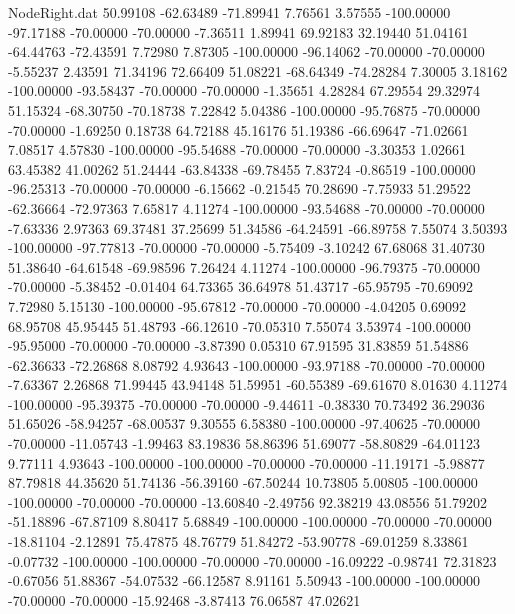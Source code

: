 \begin{filecontents}{NodeRight.dat}
  50.99108  -62.63489  -71.89941     7.76561    3.57555 -100.00000  -97.17188  -70.00000  -70.00000   -7.36511    1.89941   69.92183   32.19440
  51.04161  -64.44763  -72.43591     7.72980    7.87305 -100.00000  -96.14062  -70.00000  -70.00000   -5.55237    2.43591   71.34196   72.66409
  51.08221  -68.64349  -74.28284     7.30005    3.18162 -100.00000  -93.58437  -70.00000  -70.00000   -1.35651    4.28284   67.29554   29.32974
  51.15324  -68.30750  -70.18738     7.22842    5.04386 -100.00000  -95.76875  -70.00000  -70.00000   -1.69250    0.18738   64.72188   45.16176
  51.19386  -66.69647  -71.02661     7.08517    4.57830 -100.00000  -95.54688  -70.00000  -70.00000   -3.30353    1.02661   63.45382   41.00262
  51.24444  -63.84338  -69.78455     7.83724   -0.86519 -100.00000  -96.25313  -70.00000  -70.00000   -6.15662   -0.21545   70.28690   -7.75933
  51.29522  -62.36664  -72.97363     7.65817    4.11274 -100.00000  -93.54688  -70.00000  -70.00000   -7.63336    2.97363   69.37481   37.25699
  51.34586  -64.24591  -66.89758     7.55074    3.50393 -100.00000  -97.77813  -70.00000  -70.00000   -5.75409   -3.10242   67.68068   31.40730
  51.38640  -64.61548  -69.98596     7.26424    4.11274 -100.00000  -96.79375  -70.00000  -70.00000   -5.38452   -0.01404   64.73365   36.64978
  51.43717  -65.95795  -70.69092     7.72980    5.15130 -100.00000  -95.67812  -70.00000  -70.00000   -4.04205    0.69092   68.95708   45.95445
  51.48793  -66.12610  -70.05310     7.55074    3.53974 -100.00000  -95.95000  -70.00000  -70.00000   -3.87390    0.05310   67.91595   31.83859
  51.54886  -62.36633  -72.26868     8.08792    4.93643 -100.00000  -93.97188  -70.00000  -70.00000   -7.63367    2.26868   71.99445   43.94148
  51.59951  -60.55389  -69.61670     8.01630    4.11274 -100.00000  -95.39375  -70.00000  -70.00000   -9.44611   -0.38330   70.73492   36.29036
  51.65026  -58.94257  -68.00537     9.30555    6.58380 -100.00000  -97.40625  -70.00000  -70.00000  -11.05743   -1.99463   83.19836   58.86396
  51.69077  -58.80829  -64.01123     9.77111    4.93643 -100.00000 -100.00000  -70.00000  -70.00000  -11.19171   -5.98877   87.79818   44.35620
  51.74136  -56.39160  -67.50244    10.73805    5.00805 -100.00000 -100.00000  -70.00000  -70.00000  -13.60840   -2.49756   92.38219   43.08556
  51.79202  -51.18896  -67.87109     8.80417    5.68849 -100.00000 -100.00000  -70.00000  -70.00000  -18.81104   -2.12891   75.47875   48.76779
  51.84272  -53.90778  -69.01259     8.33861   -0.07732 -100.00000 -100.00000  -70.00000  -70.00000  -16.09222   -0.98741   72.31823   -0.67056
  51.88367  -54.07532  -66.12587     8.91161    5.50943 -100.00000 -100.00000  -70.00000  -70.00000  -15.92468   -3.87413   76.06587   47.02621

\end{filecontents}
